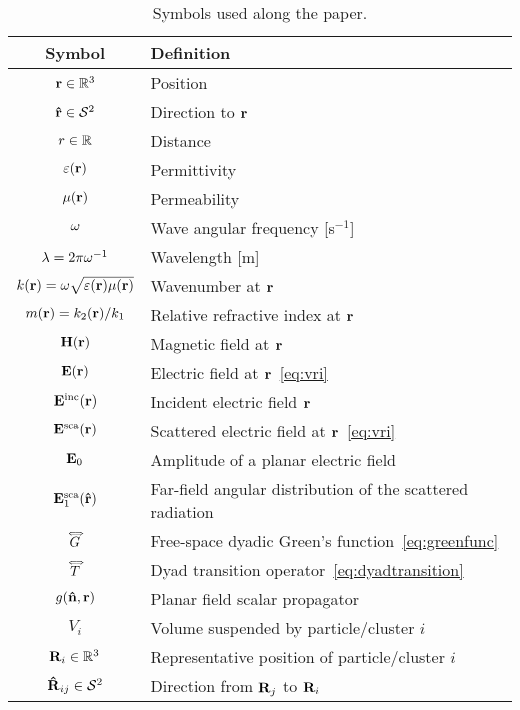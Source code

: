 \begin{table}[t]
    \caption{Symbols used along the paper.}
    \label{tb:symbols}
    \footnotesize
    \addtolength{\tabcolsep}{-1pt}
    \renewcommand{\arraystretch}{1.1}
    \begin{tabular}{cl}
        \textbf{Symbol}   & \textbf{Definition} \\ 
        \toprule
        $\mathbf{r}\in\mathbb{R}^3$ & Position \\
        $\mathbf{\hat{r}}\in\mathcal{S}^2$ & Direction to $\mathbf{r}$ \\
        $r\in\mathbb{R}$ & Distance \\
        \hline
        $\varepsilon(\mathbf{r})$ & Permittivity \\
        $\mu(\mathbf{r})$ & Permeability \\
        $\omega$ & Wave angular frequency [s$^{-1}$] \\
        $\lambda=2\pi\omega^{-1}$ & Wavelength [m] \\
        $k(\mathbf{r})=\omega\sqrt{\varepsilon(\mathbf{r})\mu(\mathbf{r})}$ & Wavenumber at $\mathbf{r}$\\
        $m(\mathbf{r})=k_2(\mathbf{r})/k_1$ & Relative refractive index at $\mathbf{r}$ \\
        \hline
        $\mathbf{H}(\mathbf{r})$ & Magnetic field at $\mathbf{r}$ \\
        $\mathbf{E}(\mathbf{r})$   & Electric field at $\mathbf{r}$~\eqref{eq:vri}  \\
        $\mathbf{E}^\text{inc}(\mathbf{r})$ & Incident electric field $\mathbf{r}$\\
        $\mathbf{E}^\text{sca}(\mathbf{r})$ & Scattered electric field at $\mathbf{r}$~\eqref{eq:vri}\\ 
        $\mathbf{E}_0$ & Amplitude of a planar electric field \\
        $\mathbf{E}^\text{sca}_1(\mathbf{\hat{r}})$ & Far-field angular distribution of the scattered radiation  \\
        \hline
        $\accentset{\Longleftrightarrow}{G}$ & Free-space dyadic Green's function~\eqref{eq:greenfunc} \\
        $\accentset{\Longleftrightarrow}{T}$ & Dyad transition operator~\eqref{eq:dyadtransition}\\
        $g(\mathbf{\hat{n}},\mathbf{r})$ & Planar field scalar propagator \\
        \hline
        \hline
        $V_i$ & Volume suspended by particle/cluster $i$ \\
        $\mathbf{R}_i\in\mathbb{R}^3$ & Representative position of particle/cluster $i$ \\
        $\mathbf{\hat{R}}_{ij}\in\mathcal{S}^2$ & Direction from $\mathbf{R}_j$ to $\mathbf{R}_i$\\

\end{tabular}
\end{table}
